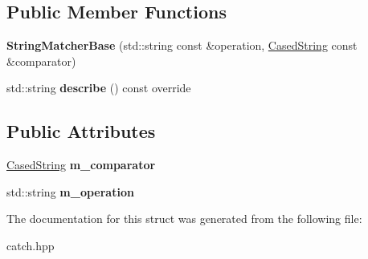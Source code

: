 \subsection*{Public Member Functions}
\begin{DoxyCompactItemize}
\item 
{\bfseries String\+Matcher\+Base} (std\+::string const \&operation, \hyperlink{structCatch_1_1Matchers_1_1StdString_1_1CasedString}{Cased\+String} const \&comparator)\hypertarget{structCatch_1_1Matchers_1_1StdString_1_1StringMatcherBase_a3a9b66bae298ae27058478529b4bb39d}{}\label{structCatch_1_1Matchers_1_1StdString_1_1StringMatcherBase_a3a9b66bae298ae27058478529b4bb39d}

\item 
std\+::string {\bfseries describe} () const override\hypertarget{structCatch_1_1Matchers_1_1StdString_1_1StringMatcherBase_a47af030f8cea42a601ffb1000eea5cca}{}\label{structCatch_1_1Matchers_1_1StdString_1_1StringMatcherBase_a47af030f8cea42a601ffb1000eea5cca}

\end{DoxyCompactItemize}
\subsection*{Public Attributes}
\begin{DoxyCompactItemize}
\item 
\hyperlink{structCatch_1_1Matchers_1_1StdString_1_1CasedString}{Cased\+String} {\bfseries m\+\_\+comparator}\hypertarget{structCatch_1_1Matchers_1_1StdString_1_1StringMatcherBase_a17c9f0fe40587070ffe998c193742831}{}\label{structCatch_1_1Matchers_1_1StdString_1_1StringMatcherBase_a17c9f0fe40587070ffe998c193742831}

\item 
std\+::string {\bfseries m\+\_\+operation}\hypertarget{structCatch_1_1Matchers_1_1StdString_1_1StringMatcherBase_a7a25c4b7d863e9a1c406d81efd0f83ca}{}\label{structCatch_1_1Matchers_1_1StdString_1_1StringMatcherBase_a7a25c4b7d863e9a1c406d81efd0f83ca}

\end{DoxyCompactItemize}


The documentation for this struct was generated from the following file\+:\begin{DoxyCompactItemize}
\item 
catch.\+hpp\end{DoxyCompactItemize}
